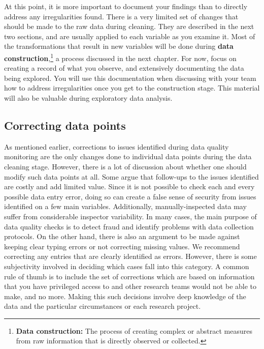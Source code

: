 \documentclass[
]{book}
\begin{document}
At this point, it is more important to document your findings
than to directly address any irregularities found.
There is a very limited set of changes that should be made to the raw data during cleaning.
They are described in the next two sections,
and are usually applied to each variable as you examine it.
Most of the transformations that result in new variables
will be done during \textbf{data construction},\footnote{\textbf{Data construction:} The process of creating complex or abstract measures
  from raw information that is directly observed or collected.}
a process discussed in the next chapter.
For now, focus on creating a record of what you observe,
and extensively documenting the data being explored.
You will use this documentation when discussing with your team
how to address irregularities once you get to the construction stage.
This material will also be valuable during exploratory data analysis.

\hypertarget{correcting-data-points}{%
\subsection*{Correcting data points}\label{correcting-data-points}}

As mentioned earlier,
corrections to issues identified during data quality monitoring are
the only changes done to individual data points during the data cleaning stage.
However, there is a lot of discussion about whether one should modify such data points at all.
Some argue that follow-ups to the issues identified are costly and add limited value.
Since it is not possible to check each and every possible data entry error,
doing so can create a false sense of security from issues identified on a few main variables.
Additionally, manually-inspected data may suffer from considerable inspector variability.
In many cases, the main purpose of data quality checks
is to detect fraud and identify problems with data collection protocols.
On the other hand, there is also an argument to be made
against keeping clear typing errors or not correcting missing values.
We recommend correcting any entries that are clearly identified as errors.
However, there is some subjectivity involved in deciding
which cases fall into this category.
A common rule of thumb is to include the set of corrections
which are based on information that you have privileged access to
and other research teams would not be able to make, and no more.
Making this such decisions involve deep knowledge of the data and
the particular circumstances or each research project.
\end{document}

